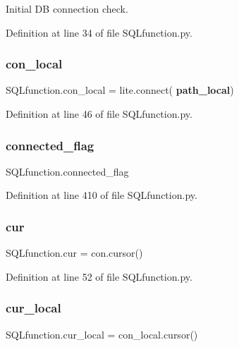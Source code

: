 Initial DB connection check. 



Definition at line 34 of file S\+Q\+Lfunction.\+py.

\mbox{\label{namespace_s_q_lfunction_af6ef43cf2e7be28e6205af9b355e4943}} 
\subsubsection{con\+\_\+local}
{\footnotesize\ttfamily S\+Q\+Lfunction.\+con\+\_\+local = lite.\+connect(\textbf{ path\+\_\+local})}



Definition at line 46 of file S\+Q\+Lfunction.\+py.

\mbox{\label{namespace_s_q_lfunction_a513a0e7846b861b6982a0449f46cb6a8}} 
\subsubsection{connected\+\_\+flag}
{\footnotesize\ttfamily S\+Q\+Lfunction.\+connected\+\_\+flag}



Definition at line 410 of file S\+Q\+Lfunction.\+py.

\mbox{\label{namespace_s_q_lfunction_aefa03c2c2ce5f2ab923453e1af7a2201}} 
\subsubsection{cur}
{\footnotesize\ttfamily S\+Q\+Lfunction.\+cur = con.\+cursor()}



Definition at line 52 of file S\+Q\+Lfunction.\+py.

\mbox{\label{namespace_s_q_lfunction_a808a7ba686f9086b3d4ef7d6a969aceb}} 
\subsubsection{cur\+\_\+local}
{\footnotesize\ttfamily S\+Q\+Lfunction.\+cur\+\_\+local = con\+\_\+local.\+cursor()}



